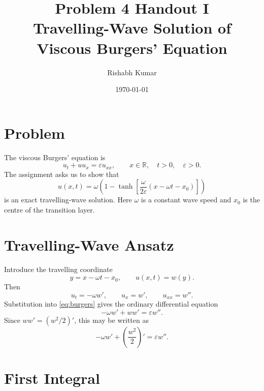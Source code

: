 \documentclass[11pt]{article}
\title{Problem 4 Handout I\\Travelling-Wave Solution of Viscous Burgers' Equation}
\author{Rishabh Kumar}
\date{\today}
\begin{document}
\maketitle

\section{Problem}

The viscous Burgers' equation is
\begin{equation}
    u_t+u u_x=\varepsilon u_{xx},
    \qquad x\in\mathbb{R},\quad t>0,\quad \varepsilon>0.
    \label{eq:burgers}
\end{equation}
The assignment asks us to show that
\begin{equation}
    u(x,t)=
    \omega\left(1-\tanh\left[
    \frac{\omega}{2\varepsilon}(x-\omega t-x_0)
    \right]\right)
    \label{eq:tw}
\end{equation}
is an exact travelling-wave solution.  Here $\omega$ is a constant wave speed and
$x_0$ is the centre of the transition layer.

\section{Travelling-Wave Ansatz}

Introduce the travelling coordinate
\begin{equation}
    y=x-\omega t-x_0,
    \qquad
    u(x,t)=w(y).
\end{equation}
Then
\begin{equation}
    u_t=-\omega w',
    \qquad
    u_x=w',
    \qquad
    u_{xx}=w''.
\end{equation}
Substitution into \eqref{eq:burgers} gives the ordinary differential equation
\begin{equation}
    -\omega w'+w w'=\varepsilon w''.
\end{equation}
Since $w w'=(w^2/2)'$, this may be written as
\begin{equation}
    -\omega w'+\left(\frac{w^2}{2}\right)'=\varepsilon w''.
\end{equation}

\section{First Integral}
\end{document}
